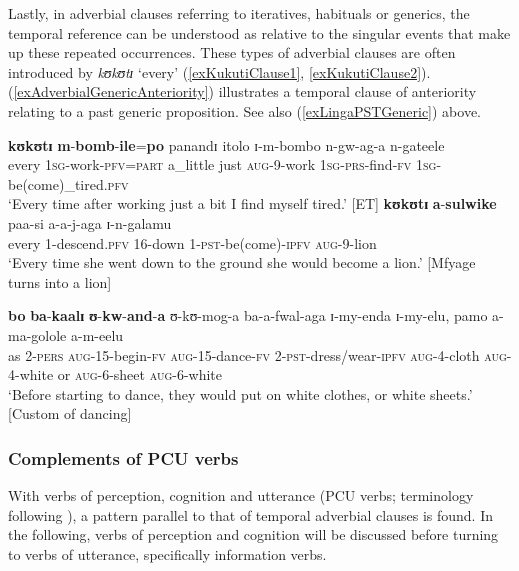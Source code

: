 Lastly, in adverbial clauses referring to iteratives, habituals or generics, the temporal reference can be understood as relative to the singular events that make up these repeated occurrences. These types of adverbial clauses are often introduced by \textit{kʊkʊtɪ} \lq every' (\ref{exKukutiClause1}, \ref{exKukutiClause2}). (\ref{exAdverbialGenericAnteriority}) illustrates a temporal clause of anteriority relating to a past generic proposition. See also (\ref{exLingaPSTGeneric}) above.
\begin{exe}
\ex \label{exKukutiClause1}\gll \textbf{kʊkʊtɪ} \textbf{m}-\textbf{bomb}-\textbf{ile}=\textbf{po} panandɪ itolo ɪ-m-bombo n-gw-ag-a n-gateele\\
every \textsc{1sg}-work-\textsc{pfv}=\textsc{part} a\_little just \textsc{aug}-9-work \textsc{1sg}-\textsc{prs}-find-\textsc{fv} \textsc{1sg}-be(come)\_tired.\textsc{pfv}\\
\glt \lq Every time after working just a bit I find myself tired.' [ET]
\ex \label{exKukutiClause2} \gll \textbf{kʊkʊtɪ} \textbf{a}-\textbf{sulwike} paa-si a-a-j-aga ɪ-n-galamu\\
every 1-descend.\textsc{pfv} 16-down 1-\textsc{pst}-be(come)-\textsc{ipfv} \textsc{aug}-9-lion\\
\glt \lq Every time she went down to the ground she would become a lion.' [Mfyage turns into a lion]

\ex\label{exAdverbialGenericAnteriority}\gll \textbf{bo} \textbf{ba}-\textbf{kaalɪ} \textbf{ʊ}-\textbf{kw}-\textbf{and}-\textbf{a} ʊ-kʊ-mog-a ba-a-fwal-aga ɪ-my-enda ɪ-my-elu, pamo a-ma-golole a-m-eelu
\\
as 2-\textsc{pers} \textsc{aug}-15-begin-\textsc{fv} \textsc{aug}-15-dance-\textsc{fv} 2-\textsc{pst}-dress/wear-\textsc{ipfv} \textsc{aug}-4-cloth \textsc{aug}-4-white or \textsc{aug}-6-sheet \textsc{aug}-6-white\\
\glt \lq Before starting to dance, they would put on white clothes, or white sheets.' [Custom of dancing]
\end{exe}
\subsubsection{Complements of PCU verbs}\label{PRSnonpstPCU}
With verbs of perception, cognition and utterance (PCU verbs; terminology following \citealt{GivonT2001}), a pattern parallel to that of temporal adverbial clauses is found. In the following, verbs of perception and cognition will be discussed before turning to verbs of utterance, specifically information verbs.

